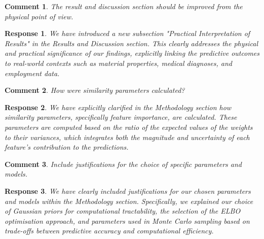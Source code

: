 \documentclass [a4paper,11pt]{article}
\theoremstyle{blue}
\newtheorem{question}{Comment}[section]
\theoremstyle{blue}
\theoremstyle{note}
\newtheorem{answer}{Response}[section]
\theoremstyle{note}
\begin{document}
\begin{question}

The result and discussion section should be improved from the physical point of view.

\end{question}

\begin{answer}

We have introduced a new subsection "Practical Interpretation of Results" in the Results and Discussion section. This clearly addresses the physical and practical significance of our findings, explicitly linking the predictive outcomes to real-world contexts such as material properties, medical diagnoses, and employment data.

\end{answer}

\begin{question}

How were similarity parameters calculated?

\end{question}

\begin{answer}

We have explicitly clarified in the Methodology section how similarity parameters, specifically feature importance, are calculated. These parameters are computed based on the ratio of the expected values of the weights to their variances, which integrates both the magnitude and uncertainty of each feature's contribution to the predictions.

\end{answer}

\begin{question}

Include justifications for the choice of specific parameters and models.

\end{question}

\begin{answer}

We have clearly included justifications for our chosen parameters and models within the Methodology section. Specifically, we explained our choice of Gaussian priors for computational tractability, the selection of the ELBO optimisation approach, and parameters used in Monte Carlo sampling based on trade-offs between predictive accuracy and computational efficiency.

\end{answer}
\end{document}
